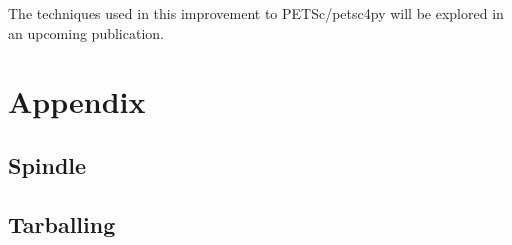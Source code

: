 \documentclass[a4paper,11pt]{article}
\begin{document}
The techniques used in this improvement to PETSc/petsc4py will be explored in an upcoming publication.


\appendix
\section{Appendix}
\label{sec:app}
\subsection{Spindle}
\label{ssec:spindle}


\subsection{Tarballing}
\label{ssec:tarball}



\end{document}
